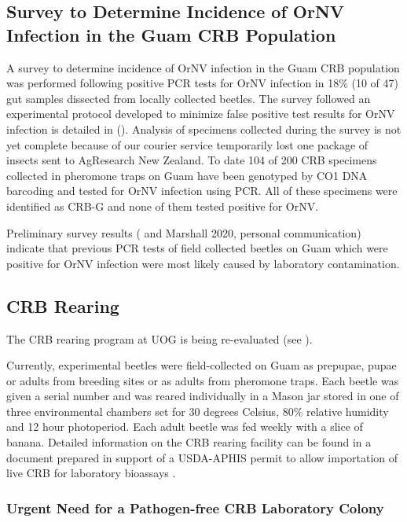 \documentclass[12pt,letterpaper,english,bibliography=totocnumbered,abstract=on]{scrartcl}
\begin{document}
\subsection{Survey to Determine Incidence of OrNV Infection in the Guam CRB Population}

A survey to determine incidence of OrNV infection in the Guam CRB population was performed following positive PCR tests for OrNV infection in 18\% (10 of 47) gut samples dissected from locally collected beetles. The survey followed an experimental protocol developed to minimize false positive test results for OrNV infection is detailed in (\cite{mooreExperimentalPlanDetermining2020}).  Analysis of specimens collected during the survey is not yet complete because of our courier service temporarily lost one package of insects sent to AgResearch New Zealand. To date 104 of 200 CRB specimens collected in pheromone traps on Guam have been genotyped by CO1 DNA barcoding and tested for OrNV infection using PCR. All of these specimens were identified as CRB-G and none of them tested positive for OrNV. 

Preliminary survey results (\cite{graselaInvestigationDeterminePresence2020} and Marshall 2020, personal communication) indicate that previous PCR tests of field collected beetles on Guam which were positive for OrNV infection were most likely caused by laboratory contamination.

\subsection{CRB Rearing}
\label{sec: rearing}


The CRB rearing program at UOG is being re-evaluated (see \cite{mooreIdeasReestablishmentCRB2020}).

Currently, experimental beetles were field-collected on Guam as prepupae, pupae or adults from breeding sites or as adults from pheromone traps.  Each beetle was given a serial number and was reared individually in a Mason jar stored in one of three environmental chambers set for 30 degrees Celsius, 80\% relative humidity and 12 hour photoperiod. Each adult beetle was fed weekly with a slice of banana. Detailed information on the CRB rearing facility can be found in a document prepared in support of a USDA-APHIS permit to allow importation of live CRB for laboratory bioassays \parencite{moore_additional_2019}.

\subsubsection{Urgent Need for a Pathogen-free CRB Laboratory Colony} 
\end{document}
